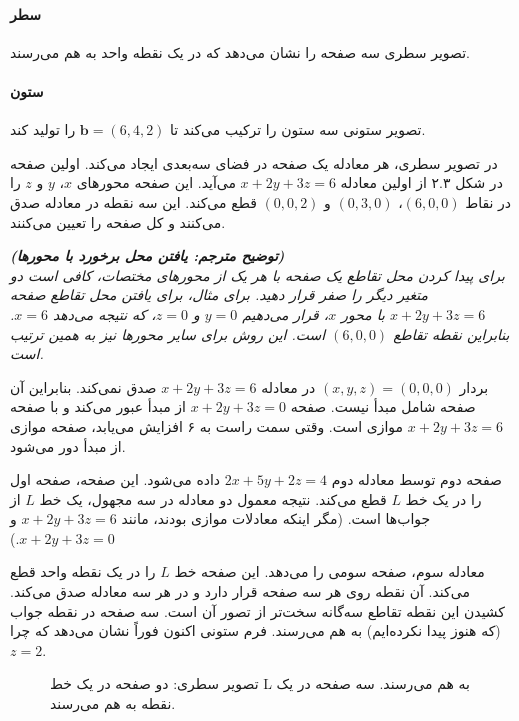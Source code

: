 \documentclass[12pt, a4paper]{book}
\begin{document}
	\paragraph{سطر} تصویر سطری سه صفحه را نشان می‌دهد که در یک نقطه واحد به هم می‌رسند.
	
	\paragraph{ستون} تصویر ستونی سه ستون را ترکیب می‌کند تا \( \mathbf{b} = (6, 4, 2) \) را تولید کند.
	
	در تصویر سطری، هر معادله یک صفحه در فضای سه‌بعدی ایجاد می‌کند. اولین صفحه در شکل ۲.۳ از اولین معادله \( x + 2y + 3z = 6 \) می‌آید. این صفحه محورهای \(x\)، \(y\) و \(z\) را در نقاط \( (6,0,0) \)، \( (0,3,0) \) و \( (0,0,2) \) قطع می‌کند. این سه نقطه در معادله صدق می‌کنند و کل صفحه را تعیین می‌کنند.
	
	\vspace{5mm}
	\textit{\textbf{(توضیح مترجم: یافتن محل برخورد با محورها)} \\
		برای پیدا کردن محل تقاطع یک صفحه با هر یک از محورهای مختصات، کافی است دو متغیر دیگر را صفر قرار دهید. برای مثال، برای یافتن محل تقاطع صفحه \(x + 2y + 3z = 6\) با محور \(x\)، قرار می‌دهیم \(y=0\) و \(z=0\)، که نتیجه می‌دهد \(x=6\). بنابراین نقطه تقاطع \((6,0,0)\) است. این روش برای سایر محورها نیز به همین ترتیب است.}
	\vspace{5mm}
	
	بردار \( (x,y,z) = (0,0,0) \) در معادله \( x + 2y + 3z = 6 \) صدق نمی‌کند. بنابراین آن صفحه شامل مبدأ نیست. صفحه \( x + 2y + 3z = 0 \) از مبدأ عبور می‌کند و با صفحه \( x + 2y + 3z = 6 \) موازی است. وقتی سمت راست به ۶ افزایش می‌یابد، صفحه موازی از مبدأ دور می‌شود.
	
	صفحه دوم توسط معادله دوم \( 2x + 5y + 2z = 4 \) داده می‌شود. این صفحه، صفحه اول را در یک خط \( L \) قطع می‌کند. نتیجه معمول دو معادله در سه مجهول، یک خط \( L \) از جواب‌ها است. (مگر اینکه معادلات موازی بودند، مانند \( x+2y+3z=6 \) و \( x+2y+3z=0 \).)
	
	معادله سوم، صفحه سومی را می‌دهد. این صفحه خط \( L \) را در یک نقطه واحد قطع می‌کند. آن نقطه روی هر سه صفحه قرار دارد و در هر سه معادله صدق می‌کند. کشیدن این نقطه تقاطع سه‌گانه سخت‌تر از تصور آن است. سه صفحه در نقطه جواب (که هنوز پیدا نکرده‌ایم) به هم می‌رسند. فرم ستونی اکنون فوراً نشان می‌دهد که چرا \( z=2 \).
	
	\begin{figure}[h!]
		\centering
		\caption{تصویر سطری: دو صفحه در یک خط L به هم می‌رسند. سه صفحه در یک نقطه به هم می‌رسند.}
	\end{figure}
	
\end{document}
